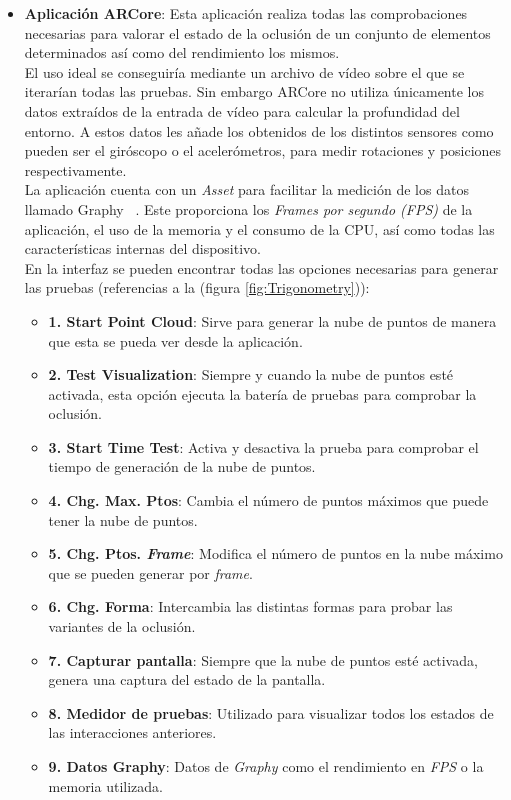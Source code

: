 \begin{itemize}
    \item \textbf{Aplicación ARCore}: Esta aplicación realiza todas las comprobaciones necesarias para valorar el estado de la oclusión de un conjunto de elementos determinados así como del rendimiento los mismos.\\
    
    El uso ideal se conseguiría mediante un archivo de vídeo sobre el que se iterarían todas las pruebas. Sin embargo ARCore no utiliza únicamente los datos extraídos de la entrada de vídeo para calcular la profundidad del entorno. A estos datos les añade los obtenidos de los distintos sensores como pueden ser el giróscopo o el acelerómetros, para medir rotaciones y posiciones respectivamente.\\
    
    La aplicación cuenta con un \textit{Asset} para facilitar la medición de los datos llamado Graphy ~\cite{Graphy}. Este proporciona los \textit{Frames por segundo (FPS)} de la aplicación, el uso de la memoria y el consumo de la CPU, así como todas las características internas del dispositivo.\\
    
    En la interfaz se pueden encontrar todas las opciones necesarias para generar las pruebas (referencias a la (figura \ref{fig:Trigonometry})): 
    \begin{itemize}
         \item \textbf{1. Start Point Cloud}: Sirve para generar la nube de puntos de manera que esta se pueda ver desde la aplicación.
         \item \textbf{2. Test Visualization}: Siempre y cuando la nube de puntos esté activada, esta opción ejecuta la batería de pruebas para comprobar la oclusión.
         \item \textbf{3. Start Time Test}: Activa y desactiva la prueba para comprobar el tiempo de generación de la nube de puntos.
         \item \textbf{4. Chg. Max. Ptos}: Cambia el número de puntos máximos que puede tener la nube de puntos.
         \item \textbf{5. Chg. Ptos. \textit{Frame}}: Modifica el número de puntos en la nube máximo que se pueden generar por \textit{frame}.
         \item \textbf{6. Chg. Forma}: Intercambia las distintas formas para probar las variantes de la oclusión.
         \item \textbf{7. Capturar pantalla}: Siempre que la nube de puntos esté activada, genera una captura del estado de la pantalla.
         \item \textbf{8. Medidor de pruebas}: Utilizado para visualizar todos los estados de las interacciones anteriores.
         \item \textbf{9. Datos Graphy}: Datos de \textit{Graphy} como el rendimiento en \textit{FPS} o la memoria utilizada.
       

\end{itemize}
\end{itemize}
